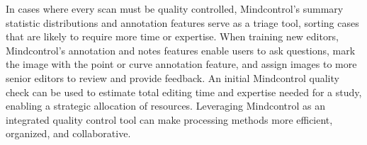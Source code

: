 In cases where every scan must be quality controlled, Mindcontrol's summary statistic distributions and annotation features serve as a triage tool, sorting cases that are likely to require more time or expertise. When training new editors, Mindcontrol's annotation and notes features enable users to ask questions, mark the image with the point or curve annotation feature, and assign images to more senior editors to review and provide feedback. An initial Mindcontrol quality check can be used to estimate total editing time and expertise needed for a study, enabling a strategic allocation of resources. Leveraging Mindcontrol as an integrated quality control tool can make processing methods more efficient, organized, and collaborative.




